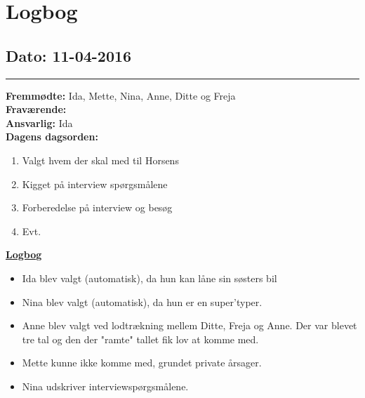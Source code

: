 \chapter{Logbog}
\section{Dato: 11-04-2016}
\hrule
\textbf{Fremmødte:} Ida, Mette, Nina, Anne, Ditte og Freja \\
\textbf{Fraværende:} \\
\textbf{Ansvarlig:} Ida  \\
\textbf{Dagens dagsorden: }
\begin{enumerate}
	\item Valgt hvem der skal med til Horsens
	\item Kigget på interview spørgsmålene
	\item Forberedelse på interview og besøg 
	\item Evt. 
\end{enumerate}

\underline{\textbf{Logbog}}
\begin{itemize}
\item Ida blev valgt (automatisk), da hun kan låne sin søsters bil
\item Nina blev valgt (automatisk), da hun er en super'typer.
\item Anne blev valgt ved lodtrækning mellem Ditte, Freja og Anne. Der var blevet tre tal og den der "ramte" tallet fik lov at komme med.
\item Mette kunne ikke komme med, grundet private årsager.
\item Nina udskriver interviewspørgsmålene. 
\end{itemize}
\newpage